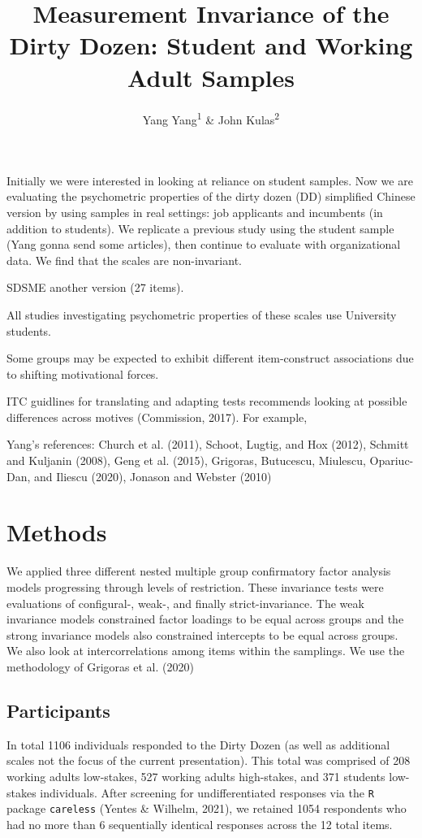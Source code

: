 \documentclass[
  english,
  man]{apa6}
\title{Measurement Invariance of the Dirty Dozen: Student and Working Adult Samples}
\author{Yang Yang\textsuperscript{1} \& John Kulas\textsuperscript{2}}
\date{}
\affiliation{\vspace{0.5cm}\textsuperscript{1} \\\textsuperscript{2} Montclair State University}
\begin{document}
\maketitle

Initially we were interested in looking at reliance on student samples. Now we are evaluating the psychometric properties of the dirty dozen (DD) simplified Chinese version by using samples in real settings: job applicants and incumbents (in addition to students). We replicate a previous study using the student sample (Yang gonna send some articles), then continue to evaluate with organizational data. We find that the scales are non-invariant.

SDSME another version (27 items).

All studies investigating psychometric properties of these scales use University students.

Some groups may be expected to exhibit different item-construct associations due to shifting motivational forces.

ITC guidlines for translating and adapting tests recommends looking at possible differences across motives (Commission, 2017). For example,

Yang's references: Church et al. (2011), Schoot, Lugtig, and Hox (2012), Schmitt and Kuljanin (2008), Geng et al. (2015), Grigoras, Butucescu, Miulescu, Opariuc-Dan, and Iliescu (2020), Jonason and Webster (2010)

\hypertarget{methods}{%
\section{Methods}\label{methods}}

We applied three different nested multiple group confirmatory factor analysis models progressing through levels of restriction. These invariance tests were evaluations of configural-, weak-, and finally strict-invariance. The weak invariance models constrained factor loadings to be equal across groups and the strong invariance models also constrained intercepts to be equal across groups. We also look at intercorrelations among items within the samplings. We use the methodology of Grigoras et al. (2020)

\hypertarget{participants}{%
\subsection{Participants}\label{participants}}

In total 1106 individuals responded to the Dirty Dozen (as well as additional scales not the focus of the current presentation). This total was comprised of 208 working adults low-stakes, 527 working adults high-stakes, and 371 students low-stakes individuals. After screening for undifferentiated responses via the \texttt{R} package \texttt{careless} (Yentes \& Wilhelm, 2021), we retained 1054 respondents who had no more than 6 sequentially identical responses across the 12 total items.
\end{document}
